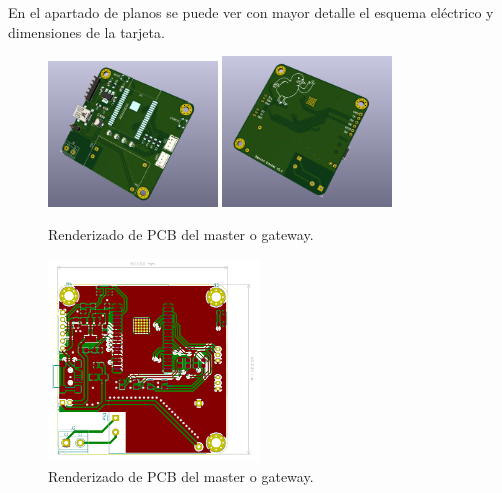 \documentclass[paper=a4, fontsize=11pt,twoside]{scrartcl}	%
\begin{document}
        En el apartado de planos se puede ver con mayor detalle el esquema eléctrico y dimensiones de la tarjeta. 
        \begin{center}
            \begin{figure}[ht]
                \centering
                \includegraphics[width=0.4\textwidth]{../receiver_1.PNG}
                \includegraphics[width=0.4\textwidth]{../receiver_2.PNG}
                \caption{Renderizado de PCB del master o gateway.}
                \label{fig:mesh5}
            \end{figure}    
        \end{center}
        \begin{center}
            \begin{figure}[ht]
                \centering
                \includegraphics[width=0.5\textwidth]{../receiver_PCB.PNG}
                \caption{Renderizado de PCB del master o gateway.}
                \label{fig:mesh6}
            \end{figure}    
        \end{center}
\end{document}
